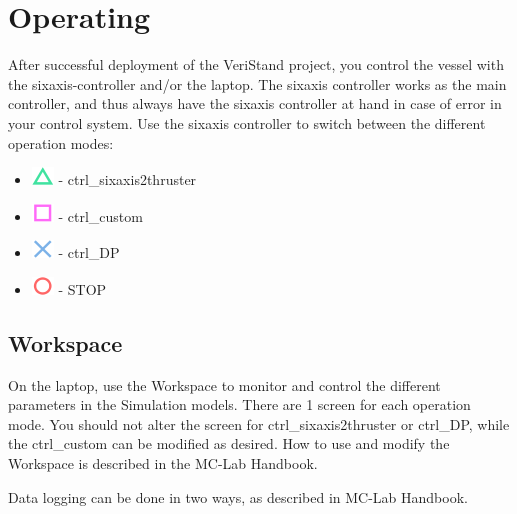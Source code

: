 \chapter{Operating}
After successful deployment of the VeriStand project, you control the vessel with the sixaxis-controller and/or the laptop. The sixaxis controller works as the main controller, and thus always have the sixaxis controller at hand in case of error in your control system. Use the sixaxis controller to switch between the different operation modes: 
\begin{itemize}
	\item \includegraphics[scale=0.4]{fig/sixaxis_triangle} - ctrl\_sixaxis2thruster
	\item \includegraphics[scale=0.4]{fig/sixaxis_square} - ctrl\_custom
	\item \includegraphics[scale=0.4]{fig/sixaxis_cross} - ctrl\_DP
	\item \includegraphics[scale=0.4]{fig/sixaxis_circle} - STOP
\end{itemize}
\section{Workspace}
On the laptop, use the Workspace to monitor and control the different parameters in the Simulation models. There are 1 screen for each operation mode. You should not alter the screen for ctrl\_sixaxis2thruster or ctrl\_DP, while the ctrl\_custom can be modified as desired. How to use and modify the Workspace is described in the MC-Lab Handbook.

Data logging can be done in two ways, as described in MC-Lab Handbook.  
